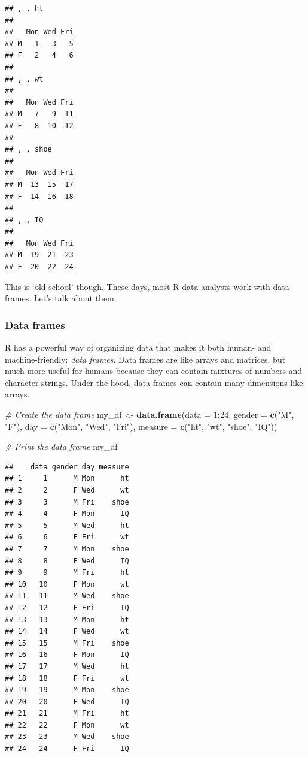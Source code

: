 \documentclass[]{article}
\newenvironment{Shaded}{\begin{snugshade}}{\end{snugshade}}
\newcommand{\KeywordTok}[1]{\textcolor[rgb]{0.13,0.29,0.53}{\textbf{#1}}}
\newcommand{\DataTypeTok}[1]{\textcolor[rgb]{0.13,0.29,0.53}{#1}}
\newcommand{\DecValTok}[1]{\textcolor[rgb]{0.00,0.00,0.81}{#1}}
\newcommand{\StringTok}[1]{\textcolor[rgb]{0.31,0.60,0.02}{#1}}
\newcommand{\CommentTok}[1]{\textcolor[rgb]{0.56,0.35,0.01}{\textit{#1}}}
\newcommand{\OperatorTok}[1]{\textcolor[rgb]{0.81,0.36,0.00}{\textbf{#1}}}
\newcommand{\NormalTok}[1]{#1}
\begin{document}
\begin{verbatim}
## , , ht
## 
##   Mon Wed Fri
## M   1   3   5
## F   2   4   6
## 
## , , wt
## 
##   Mon Wed Fri
## M   7   9  11
## F   8  10  12
## 
## , , shoe
## 
##   Mon Wed Fri
## M  13  15  17
## F  14  16  18
## 
## , , IQ
## 
##   Mon Wed Fri
## M  19  21  23
## F  20  22  24
\end{verbatim}

This is `old school' though. These days, most R data analysts work with
data frames. Let's talk about them.

\subsubsection{Data frames}\label{data-frames}

R has a powerful way of organizing data that makes it both human- and
machine-friendly: \emph{data frames}. Data frames are like arrays and
matrices, but much more useful for humans because they can contain
mixtures of numbers and character strings. Under the hood, data frames
can contain many dimensions like arrays.

\begin{Shaded}
\begin{Highlighting}[]
\CommentTok{# Create the data frame}
\NormalTok{my_df <-}\StringTok{ }\KeywordTok{data.frame}\NormalTok{(}\DataTypeTok{data =} \DecValTok{1}\OperatorTok{:}\DecValTok{24}\NormalTok{, }\DataTypeTok{gender =} \KeywordTok{c}\NormalTok{(}\StringTok{"M"}\NormalTok{, }\StringTok{"F"}\NormalTok{), }\DataTypeTok{day =} \KeywordTok{c}\NormalTok{(}\StringTok{"Mon"}\NormalTok{, }\StringTok{"Wed"}\NormalTok{, }
    \StringTok{"Fri"}\NormalTok{), }\DataTypeTok{measure =} \KeywordTok{c}\NormalTok{(}\StringTok{"ht"}\NormalTok{, }\StringTok{"wt"}\NormalTok{, }\StringTok{"shoe"}\NormalTok{, }\StringTok{"IQ"}\NormalTok{))}

\CommentTok{# Print the data frame}
\NormalTok{my_df}
\end{Highlighting}
\end{Shaded}

\begin{verbatim}
##    data gender day measure
## 1     1      M Mon      ht
## 2     2      F Wed      wt
## 3     3      M Fri    shoe
## 4     4      F Mon      IQ
## 5     5      M Wed      ht
## 6     6      F Fri      wt
## 7     7      M Mon    shoe
## 8     8      F Wed      IQ
## 9     9      M Fri      ht
## 10   10      F Mon      wt
## 11   11      M Wed    shoe
## 12   12      F Fri      IQ
## 13   13      M Mon      ht
## 14   14      F Wed      wt
## 15   15      M Fri    shoe
## 16   16      F Mon      IQ
## 17   17      M Wed      ht
## 18   18      F Fri      wt
## 19   19      M Mon    shoe
## 20   20      F Wed      IQ
## 21   21      M Fri      ht
## 22   22      F Mon      wt
## 23   23      M Wed    shoe
## 24   24      F Fri      IQ
\end{verbatim}
\end{document}
